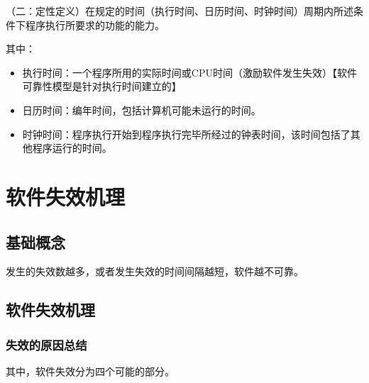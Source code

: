 （二：定性定义）在规定的时间（执行时间、日历时间、时钟时间）周期内所述条件下程序执行所要求的功能的能力。

其中：
\begin{itemize}
  \item 执行时间：一个程序所用的实际时间或CPU时间（激励软件发生失效）【软件可靠性模型是针对执行时间建立的】
  \item 日历时间：编年时间，包括计算机可能未运行的时间。
  \item 时钟时间：程序执行开始到程序执行完毕所经过的钟表时间，该时间包括了其他程序运行的时间。
\end{itemize}

\section{软件失效机理}

\subsection{基础概念}

发生的失效数越多，或者发生失效的时间间隔越短，软件越不可靠。

\subsection{软件失效机理}

\subsubsection{失效的原因总结}

其中，软件失效分为四个可能的部分。


